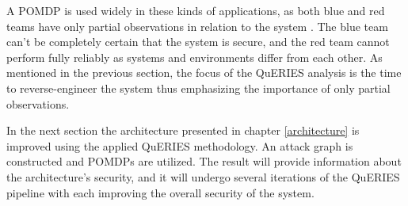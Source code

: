 A POMDP is used widely in these kinds of applications, as both blue and
red teams have only partial observations in relation to the system
\cite{mcabeeMarkov}. The blue team can't be completely certain that
the system is secure, and the red team cannot perform fully reliably as
systems and environments differ from each other. As mentioned in the
previous section, the focus of the QuERIES analysis is the time to
reverse-engineer the system thus emphasizing the importance of only
partial observations.

In the next section the architecture presented in chapter
\ref{architecture} is improved using the applied QuERIES methodology. An
attack graph is constructed and POMDPs are utilized. The result will
provide information about the architecture's security, and it will
undergo several iterations of the QuERIES pipeline with each improving
the overall security of the system.
